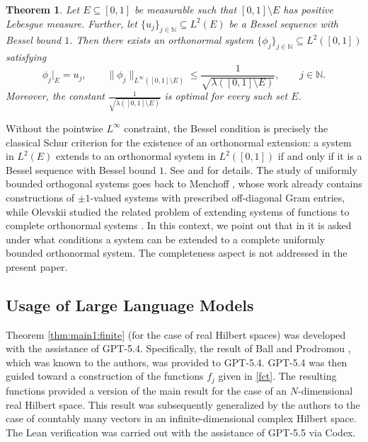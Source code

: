 \documentclass[reqno,a4paper,12pt]{amsart}
\numberwithin{equation}{section}
\newtheorem{theorem}[definition]{Theorem}
\def\N{{\mathbb N}}
\newcommand\1{\mathds{1}}
\begin{document}
\begin{theorem}\label{thm:main2}
Let $E\subseteq[0,1]$ be measurable such that $[0,1]\setminus E$ has positive Lebesgue measure.
Further, let $\{ u_j \}_{j\in \N} \subseteq L^2(E)$
be a Bessel sequence with Bessel bound $1$. Then there exists an orthonormal system $\{ \phi_j \}_{j\in \N}\subseteq L^2([0,1])$ satisfying
$$
\phi_j|_E=u_j,
\qquad
\|\phi_j\|_{L^\infty([0,1]\setminus E)}
\le
\frac{1}{\sqrt{\lambda([0,1]\setminus E)}},
\qquad
j\in \N.
$$
Moreover, the constant $\frac{1}{\sqrt{\lambda([0,1]\setminus E)}}$ is optimal for every such set $E$.
\end{theorem}

Without the pointwise $L^\infty$ constraint, the Bessel condition is precisely the classical Schur criterion for the existence of an orthonormal extension: a system in $L^2(E)$ extends to an orthonormal system in $L^2([0,1])$ if and only if it is a Bessel sequence with Bessel bound $1$. See \cite[p.~70]{KS35} and \cite[p.~934]{kashinSzarek2003knaster} for details.
The study of uniformly bounded orthogonal systems goes back to Menchoff \cite{menchoff1938}, whose work already contains constructions of $\pm 1$-valued systems with prescribed off-diagonal Gram entries, while Olevskii studied the related problem of extending systems of functions to complete orthonormal systems \cite{olevskii1969extension}. In this context, we point out that in \cite[p.~58]{Olevskii} it is asked under what conditions a system can be extended to a complete uniformly bounded orthonormal system. The completeness aspect is not addressed in the present paper.

\subsection*{Usage of Large Language Models}

Theorem \ref{thm:main1:finite} (for the case of real Hilbert spaces) was developed with the assistance of GPT-5.4. Specifically, the result of Ball and Prodromou \cite{ballProdromou2009}, which was known to the authors, was provided to GPT-5.4. GPT-5.4 was then guided toward a construction of the functions $f_j$ given in \eqref{fct}. The resulting functions provided a version of the main result for the case of an $N$-dimensional real Hilbert space. This result was subsequently generalized by the authors to the case of countably many vectors in an infinite-dimensional complex Hilbert space. The Lean verification was carried out with the assistance of GPT-5.5 via Codex.
\end{document}
